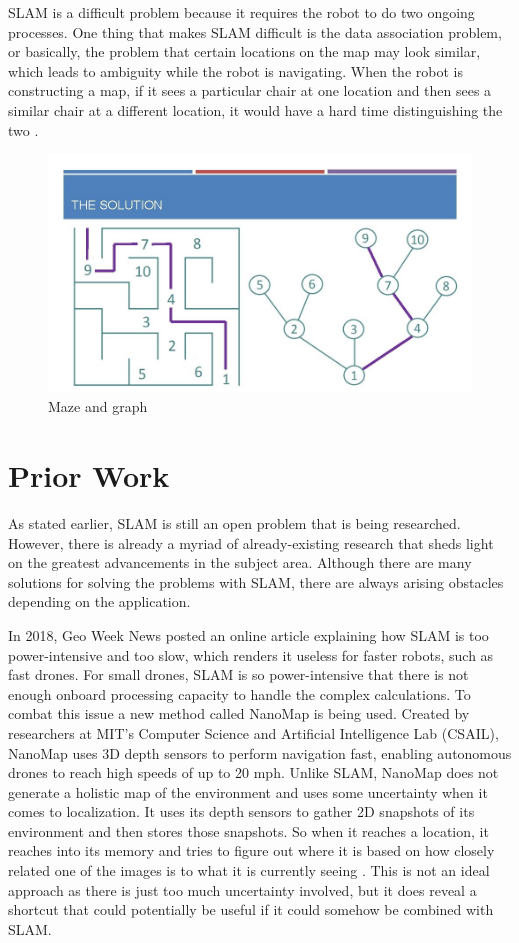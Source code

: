 \documentclass[10pt,twocolumn]{article}
\begin{document}
SLAM is a difficult problem because it requires the robot to do two ongoing processes. One thing that makes SLAM difficult is the data association problem, or basically, the problem that certain locations on the map may look similar, which leads to ambiguity while the robot is navigating. When the robot is constructing a map, if it sees a particular chair at one location and then sees a similar chair at a different location, it would have a hard time distinguishing the two \textcite{Mataric2008TheRoboticsPrimer}.

  \begin{figure}
    \centering
    \includegraphics[width=.95\linewidth]{graph.jpg}
    \caption{
        Maze and graph}
    \label{fig:Figure1}
\end{figure}
  

\section{Prior Work}
As stated earlier, SLAM is still an open problem that is being researched. However, there is already a myriad of already-existing research that sheds light on the greatest advancements in the subject area. Although there are many solutions for solving the problems with SLAM, there are always arising obstacles depending on the application.

In 2018, Geo Week News posted an online article explaining how SLAM is too power-intensive and too slow, which renders it useless for faster robots, such as fast drones. For small drones, SLAM is so power-intensive that there is not enough onboard processing capacity to handle the complex calculations. To combat this issue a new method called NanoMap is being used. Created by researchers at MIT’s Computer Science and Artificial Intelligence Lab (CSAIL), NanoMap uses 3D depth sensors to perform navigation fast, enabling autonomous drones to reach high speeds of up to 20 mph. Unlike SLAM, NanoMap does not generate a holistic map of the environment and uses some uncertainty when it comes to localization. It uses its depth sensors to gather 2D snapshots of its environment and then stores those snapshots. So when it reaches a location, it reaches into its memory and tries to figure out where it is based on how closely related one of the images is to what it is currently seeing \textcite{GeoWeekNewsStaff2018NanoMap}. This is not an ideal approach as there is just too much uncertainty involved, but it does reveal a shortcut that could potentially be useful if it could somehow be combined with SLAM.
\end{document}

